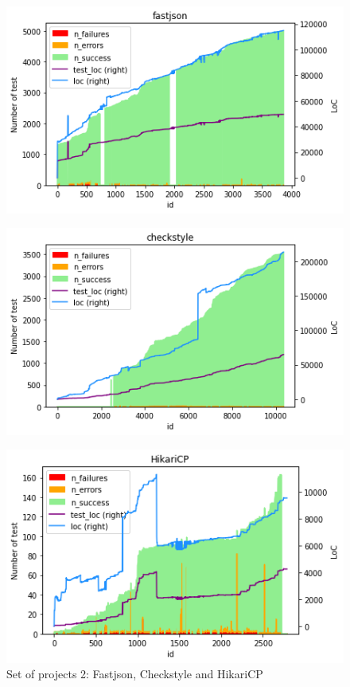 \begin{figure}[!htb]
    \caption{Set of projects 2: Fastjson, Checkstyle and HikariCP}
    \label{fig:projects-2}
    \begin{minipage}{.5\linewidth}
        \centering
        \includegraphics[width=\textwidth]{pages/02-Testability/images/projects/fastjson.png}
        \label{fig:fastjson}
    \end{minipage}%
    \begin{minipage}{.5\linewidth}
        \centering
        \includegraphics[width=\textwidth]{pages/02-Testability/images/projects/checkstyle.png}
        \label{fig:checkstyle}
    \end{minipage}
    \begin{minipage}{.5\linewidth}
        \centering
        \includegraphics[width=\textwidth]{pages/02-Testability/images/projects/hikari.png}

\end{minipage}
\end{figure}
